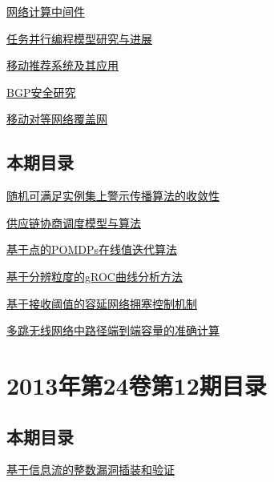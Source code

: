 \documentclass[a4paper]{article}
\begin{document}
\href{http://www.jos.org.cn/ch/reader/download_pdf.aspx?file_no=4296&year_id=2013&quarter_id=1&falg=1}{网络计算中间件}

\href{http://www.jos.org.cn/ch/reader/download_pdf.aspx?file_no=4339&year_id=2013&quarter_id=1&falg=1}{任务并行编程模型研究与进展}

\href{http://www.jos.org.cn/ch/reader/download_pdf.aspx?file_no=4292&year_id=2013&quarter_id=1&falg=1}{移动推荐系统及其应用}

\href{http://www.jos.org.cn/ch/reader/download_pdf.aspx?file_no=4346&year_id=2013&quarter_id=1&falg=1}{BGP安全研究}

\href{http://www.jos.org.cn/ch/reader/download_pdf.aspx?file_no=4332&year_id=2013&quarter_id=1&falg=1}{移动对等网络覆盖网}

\subsection{本期目录}
\href{http://www.jos.org.cn/ch/reader/download_pdf.aspx?file_no=4213&year_id=2013&quarter_id=1&falg=1}{随机可满足实例集上警示传播算法的收敛性}

\href{http://www.jos.org.cn/ch/reader/download_pdf.aspx?file_no=4211&year_id=2013&quarter_id=1&falg=1}{供应链协商调度模型与算法}

\href{http://www.jos.org.cn/ch/reader/download_pdf.aspx?file_no=4258&year_id=2013&quarter_id=1&falg=1}{基于点的POMDPs在线值迭代算法}

\href{http://www.jos.org.cn/ch/reader/download_pdf.aspx?file_no=4230&year_id=2013&quarter_id=1&falg=1}{基于分辨粒度的gROC曲线分析方法}

\href{http://www.jos.org.cn/ch/reader/download_pdf.aspx?file_no=4218&year_id=2013&quarter_id=1&falg=1}{基于接收阈值的容延网络拥塞控制机制}

\href{http://www.jos.org.cn/ch/reader/download_pdf.aspx?file_no=4220&year_id=2013&quarter_id=1&falg=1}{多跳无线网络中路径端到端容量的准确计算}


\section{\textbf{2013年第24卷第12期目录}}
\subsection{本期目录}
\href{http://www.jos.org.cn/ch/reader/download_pdf.aspx?file_no=4385&year_id=2013&quarter_id=12&falg=1}{基于信息流的整数漏洞插装和验证}
\end{document}
